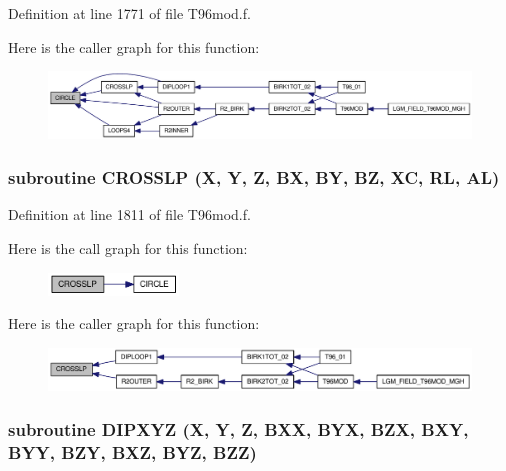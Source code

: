 Definition at line 1771 of file T96mod.f.

Here is the caller graph for this function:\nopagebreak
\begin{figure}[H]
\begin{center}
\leavevmode
\includegraphics[width=388pt]{_t96mod_8f_7ad3cc17a6906d0de0ea87905c8adfa0_icgraph}
\end{center}
\end{figure}
\hypertarget{_t96mod_8f_339de23a7fc16677d5c934050601456b}{
\subsubsection[{CROSSLP}]{\setlength{\rightskip}{0pt plus 5cm}subroutine CROSSLP (X, \/  Y, \/  Z, \/  BX, \/  BY, \/  BZ, \/  XC, \/  RL, \/  AL)}}
\label{_t96mod_8f_339de23a7fc16677d5c934050601456b}




Definition at line 1811 of file T96mod.f.

Here is the call graph for this function:\nopagebreak
\begin{figure}[H]
\begin{center}
\leavevmode
\includegraphics[width=98pt]{_t96mod_8f_339de23a7fc16677d5c934050601456b_cgraph}
\end{center}
\end{figure}


Here is the caller graph for this function:\nopagebreak
\begin{figure}[H]
\begin{center}
\leavevmode
\includegraphics[width=344pt]{_t96mod_8f_339de23a7fc16677d5c934050601456b_icgraph}
\end{center}
\end{figure}
\hypertarget{_t96mod_8f_76f3ffff48346c7a53f738f013945222}{
\subsubsection[{DIPXYZ}]{\setlength{\rightskip}{0pt plus 5cm}subroutine DIPXYZ (X, \/  Y, \/  Z, \/  BXX, \/  BYX, \/  BZX, \/  BXY, \/  BYY, \/  BZY, \/  BXZ, \/  BYZ, \/  BZZ)}}
\label{_t96mod_8f_76f3ffff48346c7a53f738f013945222}




